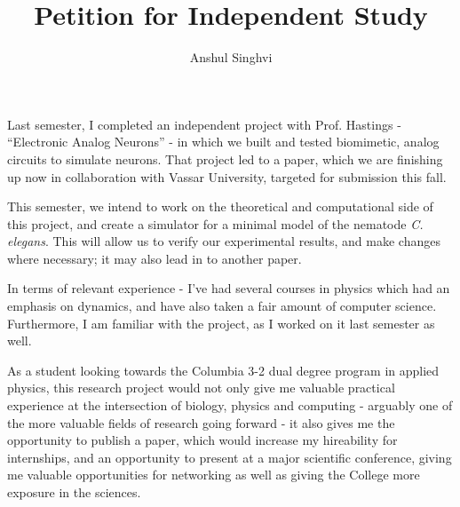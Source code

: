 \documentclass[12pt]{article}
\title{Petition for Independent Study}
\author{Anshul Singhvi}
\begin{document}
\maketitle

\doublespacing

Last semester, I completed an independent project with Prof. Hastings - ``Electronic Analog Neurons'' - in which we built and tested biomimetic, analog circuits to simulate neurons.
That project led to a paper, which we are finishing up now in collaboration with Vassar University, targeted for submission this fall.

This semester, we intend to work on the theoretical and computational side of this project, and create a simulator for a minimal model of the nematode \textit{C. elegans}.  This will allow us to verify our experimental results, and make changes where necessary; it may also lead in to another paper.

In terms of relevant experience - I've had several courses in physics which had an emphasis on dynamics, and have also taken a fair amount of computer science.  Furthermore, I am familiar with the project, as I worked on it last semester as well.

As a student looking towards the Columbia 3-2 dual degree program in applied physics, this research project would not only give me valuable practical experience at the intersection of biology, physics and computing - arguably one of the more valuable fields of research going forward - it also gives me the opportunity to publish a paper, which would increase my hireability for internships, and an opportunity to present at a major scientific conference, giving me valuable opportunities for networking as well as giving the College more exposure in the sciences.
\end{document}
